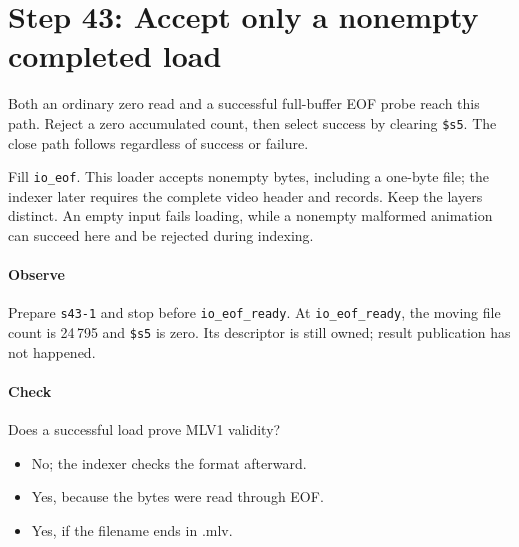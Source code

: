 \section{Step 43: Accept only a nonempty completed load}
Both an ordinary zero read and a successful full-buffer EOF probe reach
this path. Reject a zero accumulated count, then select success by clearing
\texttt{\$s5}. The close path follows regardless of success or failure.

Fill \texttt{io\_eof}. This loader accepts nonempty bytes, including a
one-byte file; the indexer later requires the complete video header and records.
Keep the layers distinct. An empty input fails loading, while a nonempty
malformed animation can succeed here and be rejected during indexing.

\paragraph{Observe} Prepare \texttt{s43-1} and stop before
\texttt{io\_eof\_ready}. At \texttt{io\_eof\_ready}, the moving file count is
24\,795 and \texttt{\$s5} is zero. Its descriptor is still owned; result
publication has not happened.

\paragraph{Check} Does a successful load prove MLV1 validity?
\begin{itemize}
  \item[A.] No; the indexer checks the format afterward.
  \item[B.] Yes, because the bytes were read through EOF.
  \item[C.] Yes, if the filename ends in .mlv.
\end{itemize}
